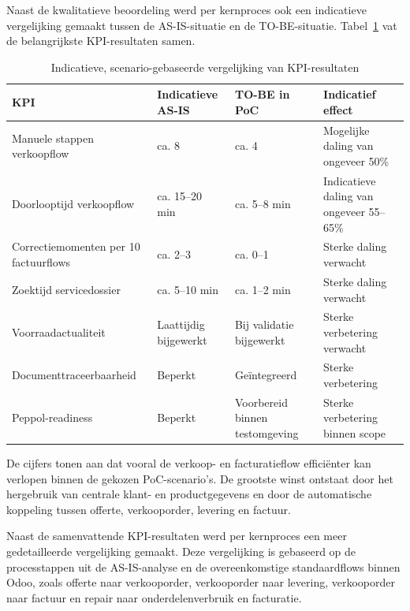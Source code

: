 Naast de kwalitatieve beoordeling werd per kernproces ook een indicatieve vergelijking gemaakt tussen de AS-IS-situatie en de TO-BE-situatie. Tabel~\ref{tab:kpi-resultaten} vat de belangrijkste KPI-resultaten samen.

\begin{table}[H]
\centering
\caption{Indicatieve, scenario-gebaseerde vergelijking van KPI-resultaten}
\label{tab:kpi-resultaten}
\begin{tabular}{|p{4cm}|p{3cm}|p{3cm}|p{3cm}|}
\hline
\textbf{KPI} & \textbf{Indicatieve AS-IS} & \textbf{TO-BE in PoC} & \textbf{Indicatief effect} \\
\hline
Manuele stappen verkoopflow & ca. 8 & ca. 4 & Mogelijke daling van ongeveer 50\% \\
\hline
Doorlooptijd verkoopflow & ca. 15--20 min & ca. 5--8 min & Indicatieve daling van ongeveer 55--65\% \\
\hline
Correctiemomenten per 10 factuurflows & ca. 2--3 & ca. 0--1 & Sterke daling verwacht \\
\hline
Zoektijd servicedossier & ca. 5--10 min & ca. 1--2 min & Sterke daling verwacht \\
\hline
Voorraadactualiteit & Laattijdig bijgewerkt & Bij validatie bijgewerkt & Sterke verbetering verwacht \\
\hline
Documenttraceerbaarheid & Beperkt & Geïntegreerd & Sterke verbetering \\
\hline
Peppol-readiness & Beperkt & Voorbereid binnen testomgeving & Sterke verbetering binnen scope \\
\hline
\end{tabular}
\end{table}

De cijfers tonen aan dat vooral de verkoop- en facturatieflow efficiënter kan verlopen binnen de gekozen PoC-scenario's. De grootste winst ontstaat door het hergebruik van centrale klant- en productgegevens en door de automatische koppeling tussen offerte, verkooporder, levering en factuur.

Naast de samenvattende KPI-resultaten werd per kernproces een meer gedetailleerde vergelijking gemaakt. Deze vergelijking is gebaseerd op de processtappen uit de AS-IS-analyse en de overeenkomstige standaardflows binnen Odoo, zoals offerte naar verkooporder, verkooporder naar levering, verkooporder naar factuur en repair naar onderdelenverbruik en facturatie.

